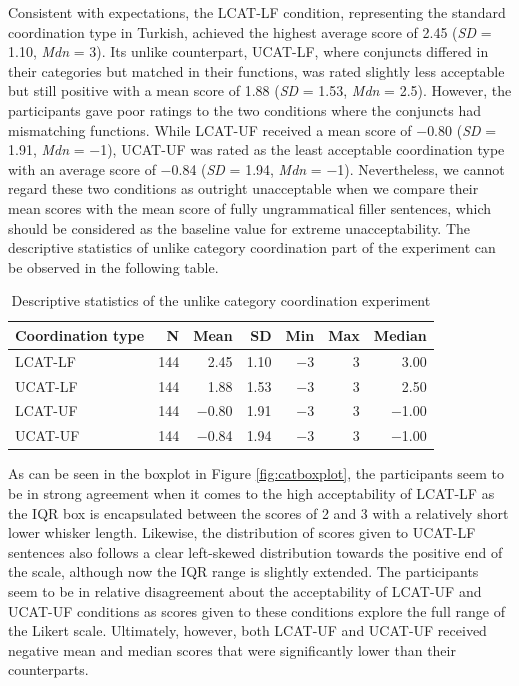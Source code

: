Consistent with expectations, the LCAT-LF condition, representing the standard coordination type in Turkish, achieved the highest average score of 2.45 (\textit{SD} = 1.10, \textit{Mdn} = 3). Its unlike counterpart, UCAT-LF, where conjuncts differed in their categories but matched in their functions, was rated slightly less acceptable but still positive with a mean score of 1.88 (\textit{SD} = 1.53, \textit{Mdn} = 2.5). However, the participants gave poor ratings to the two conditions where the conjuncts had mismatching functions. While LCAT-UF received a mean score of $-$0.80 (\textit{SD} = 1.91, \textit{Mdn} = $-$1), UCAT-UF was rated as the least acceptable coordination type with an average score of $-$0.84 (\textit{SD} = 1.94, \textit{Mdn} = $-$1). Nevertheless, we cannot regard these two conditions as outright unacceptable when we compare their mean scores with the mean score of fully ungrammatical filler sentences, which should be considered as the baseline value for extreme unacceptability. The descriptive statistics of unlike category coordination part of the experiment can be observed in the following table.

\begin{table}[ht]
	\centering
	\begin{tabular}{lrrrrrr}
		\textbf{Coordination type} & \textbf{N} & \textbf{Mean} & \textbf{SD} & \textbf{Min} & \textbf{Max} & \textbf{Median} \\ 
		\hline \hline
		LCAT-LF & 144 & 2.45 & 1.10 &  $-$3 &   3 & 3.00  \\
		UCAT-LF & 144 & 1.88 & 1.53 &  $-$3 &   3 & 2.50  \\ 
		LCAT-UF & 144 & $-$0.80 & 1.91 &  $-$3 &   3 & $-$1.00  \\ 
		UCAT-UF & 144 & $-$0.84 & 1.94 &  $-$3 &   3 & $-$1.00  \\ 
		\hline
		\hline
	\end{tabular}
	\caption{Descriptive statistics of the unlike category coordination experiment} 
\end{table}

As can be seen in the boxplot in Figure \ref{fig:catboxplot}, the participants seem to be in strong agreement when it comes to the high acceptability of LCAT-LF as the IQR box is encapsulated between the scores of 2 and 3 with a relatively short lower whisker length. Likewise, the distribution of scores given to UCAT-LF sentences also follows a clear left-skewed distribution towards the positive end of the scale, although now the IQR range is slightly extended. The participants seem to be in relative disagreement about the acceptability of LCAT-UF and UCAT-UF conditions as scores given to these conditions explore the full range of the Likert scale. Ultimately, however, both LCAT-UF and UCAT-UF received negative mean and median scores that were significantly lower than their counterparts. 

